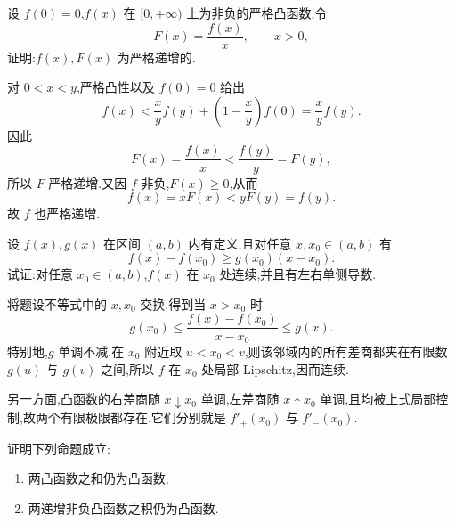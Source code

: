 \begin{example}
    设 $f(0)=0$,$f(x)$ 在 $\lbrack 0,+\infty)$ 上为非负的严格凸函数,令
    \[
        F(x)=\dfrac{f(x)}{x},\qquad x>0,
    \]
    证明:$f(x),F(x)$ 为严格递增的.
\end{example}
\exampleblank

\begin{solution}
    对 $0<x<y$,严格凸性以及 $f(0)=0$ 给出
    \[
        f(x)
        <\dfrac{x}{y}f(y)+\left(1-\dfrac{x}{y}\right)f(0)
        =\dfrac{x}{y}f(y).
    \]
    因此
    \[
        F(x)=\dfrac{f(x)}{x}<\dfrac{f(y)}{y}=F(y),
    \]
    所以 $F$ 严格递增.又因 $f$ 非负,$F(x)\geq0$,从而
    \[
        f(x)=xF(x)<yF(y)=f(y).
    \]
    故 $f$ 也严格递增.
\end{solution}

\begin{example}
    设 $f(x),g(x)$ 在区间 $(a,b)$ 内有定义,且对任意 $x,x_0\in(a,b)$ 有
    \[
        f(x)-f(x_0)\geq g(x_0)(x-x_0).
    \]
    试证:对任意 $x_0\in(a,b)$,$f(x)$ 在 $x_0$ 处连续,并且有左右单侧导数.
\end{example}
\exampleblank

\begin{solution}
    将题设不等式中的 $x,x_0$ 交换,得到当 $x>x_0$ 时
    \[
        g(x_0)
        \leq\dfrac{f(x)-f(x_0)}{x-x_0}
        \leq g(x).
    \]
    特别地,$g$ 单调不减.在 $x_0$ 附近取 $u<x_0<v$,则该邻域内的所有差商都夹在有限数 $g(u)$ 与 $g(v)$ 之间,所以 $f$ 在 $x_0$ 处局部 Lipschitz,因而连续.

    另一方面,凸函数的右差商随 $x\downarrow x_0$ 单调,左差商随 $x\uparrow x_0$ 单调,且均被上式局部控制,故两个有限极限都存在.它们分别就是 $f'_+(x_0)$ 与 $f'_-(x_0)$.
\end{solution}

\begin{example}
    证明下列命题成立:
    \begin{enumerate}
        \item 两凸函数之和仍为凸函数;
        \item 两递增非负凸函数之积仍为凸函数.
    \end{enumerate}
\end{example}
\exampleblank

